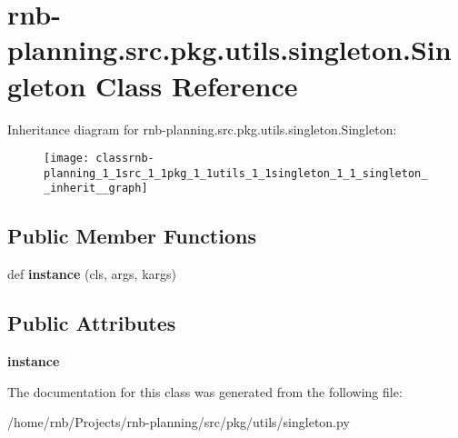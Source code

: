 \hypertarget{classrnb-planning_1_1src_1_1pkg_1_1utils_1_1singleton_1_1_singleton}{}\section{rnb-\/planning.src.\+pkg.\+utils.\+singleton.\+Singleton Class Reference}
\label{classrnb-planning_1_1src_1_1pkg_1_1utils_1_1singleton_1_1_singleton}


Inheritance diagram for rnb-\/planning.src.\+pkg.\+utils.\+singleton.\+Singleton\+:\nopagebreak
\begin{figure}[H]
\begin{center}
\leavevmode
\texttt{[image: classrnb-planning\_1\_1src\_1\_1pkg\_1\_1utils\_1\_1singleton\_1\_1\_singleton\_\_inherit\_\_graph]}
\end{center}
\end{figure}
\subsection*{Public Member Functions}
\begin{DoxyCompactItemize}
\item 
\mbox{\label{classrnb-planning_1_1src_1_1pkg_1_1utils_1_1singleton_1_1_singleton_ab2d4703186ff50c41372439517045bf6}} 
def {\bfseries instance} (cls, args, kargs)
\end{DoxyCompactItemize}
\subsection*{Public Attributes}
\begin{DoxyCompactItemize}
\item 
\mbox{\label{classrnb-planning_1_1src_1_1pkg_1_1utils_1_1singleton_1_1_singleton_aba2f3c0282609ccbd36e6d105691f1ec}} 
{\bfseries instance}
\end{DoxyCompactItemize}


The documentation for this class was generated from the following file\+:\begin{DoxyCompactItemize}
\item 
/home/rnb/\+Projects/rnb-\/planning/src/pkg/utils/singleton.\+py\end{DoxyCompactItemize}
